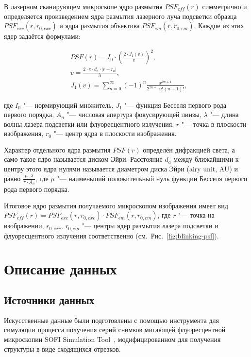 В лазерном сканирующем микроскопе ядро размытия $PSF_{eff}\left(r\right)$ симметрично и определяется произведением ядра размытия лазерного луча подсветки образца $PSF_{exc}\left(r,r_{0,exc}\right)$ и ядра размытия объектива $PSF_{em}\left(r,r_{0,em}\right)$. Каждое из этих ядер задаётся формулами:

\begin{align*}
	&PSF\left(r\right) = I_0 \cdot \left(\frac{2\cdot J_1\left(v\right)}{v}\right)^2, \\
	&v=\frac{2\cdot\pi\cdot d_a\cdot\left|r-r_0\right|}{\lambda}, \\
	&J_1(v)=\sum_{n=0}^{\infty}{\left(-1\right)^n\frac{x^{2n+1}}{2^{2n+1}n!\left(n+1\right)!}},
\end{align*}

\noindent где $I_0$ "--- нормирующий множитель, $J_1$ "--- функция Бесселя первого рода первого порядка, $A_n$ "--- числовая апертура фокусирующей линзы, $\lambda$ "--- длина волны лазера подсветки или флуоресцентного излучения, $r$ "--- точка в плоскости изображения, $r_0$ "--- центр ядра в плоскости изображения.

Характер отдельного ядра размытия $PSF\left(r\right)$ определён дифракцией света, а само такое ядро называется диском Эйри. Расстояние $d_a$ между ближайшими к центру этого ядра нулями называется диаметром диска Эйри (airy unit, AU) и равно $\frac{\mu\cdot \lambda}{\pi \cdot A_n}$, где $\mu$ "--- наименьший положительный нуль функции Бесселя первого рода первого порядка.

Итоговое ядро размытия получаемого микроскопом изображения имеет вид $PSF_{eff}\left(r\right)=PSF_{exc}\left(r,r_{0,exc}\right)\cdot PSF_{em}\left(r,r_{0,em}\right)$, где $r$ "--- точка на изображении, $r_{0,exc}$, $r_{0,em}$ "--- центры ядер размытия лазера подсветки и флуоресцентного излучения соответственно (см.~Рис.~\ref{fig:blinking-psf}).

\section{Описание данных}

\subsection{Источники данных}

Искусственные данные были подготовлены с помощью инструмента для симуляции процесса получения серий снимков мигающей флуоресцентной микроскопии SOFI Simulation Tool~\cite{10.1371/journal.pone.0161602}, модифицированном для получения структуры в виде сходящихся отрезков.

